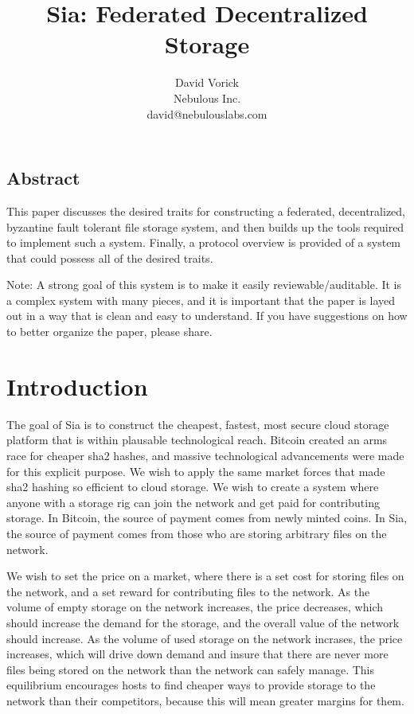 \documentclass[twocolumn]{article}
\begin{document}
\frenchspacing

\title{Sia: Federated Decentralized Storage}

\author{
{\rm David Vorick}\\
Nebulous Inc.\\
david@nebulouslabs.com
}

\maketitle

\subsection*{Abstract}
This paper discusses the desired traits for constructing a federated, decentralized, byzantine fault tolerant file storage system, and then builds up the tools required to implement such a system. Finally, a protocol overview is provided of a system that could possess all of the desired traits.

Note: A strong goal of this system is to make it easily reviewable/auditable.
It is a complex system with many pieces, and it is important that the paper is layed out in a way that is clean and easy to understand.
If you have suggestions on how to better organize the paper, please share.

\section{Introduction}
The goal of Sia is to construct the cheapest, fastest, most secure cloud storage platform that is within plausable technological reach.
Bitcoin created an arms race for cheaper sha2 hashes, and massive technological advancements were made for this explicit purpose.
We wish to apply the same market forces that made sha2 hashing so efficient to cloud storage.
We wish to create a system where anyone with a storage rig can join the network and get paid for contributing storage.
In Bitcoin, the source of payment comes from newly minted coins.
In Sia, the source of payment comes from those who are storing arbitrary files on the network.

We wish to set the price on a market, where there is a set cost for storing files on the network, and a set reward for contributing files to the network.
As the volume of empty storage on the network increases, the price decreases, which should increase the demand for the storage, and the overall value of the network should increase.
As the volume of used storage on the network incrases, the price increases, which will drive down demand and insure that there are never more files being stored on the network than the network can safely manage.
This equilibrium encourages hosts to find cheaper ways to provide storage to the network than their competitors, because this will mean greater margins for them.
\end{document}
